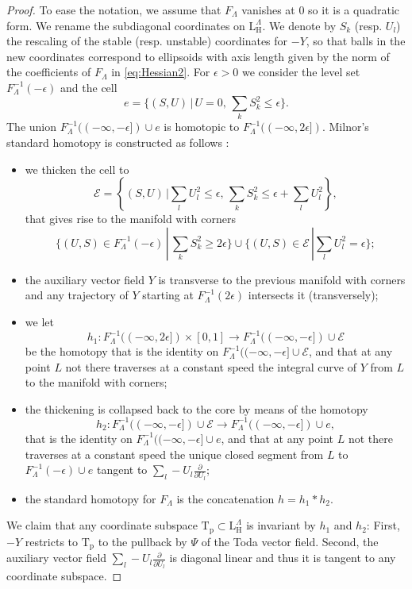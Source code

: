 \documentclass[reqno]{amsart}
\newcommand{\p}{\mathrm{p}}
\newcommand{\T}{\mathbb{T}}
\renewcommand{\L}{\mathrm{L}}
\renewcommand{\T}{\mathrm{T}}
\renewcommand{\H}{\mathrm{H}}
\begin{document}
\begin{proof}
To ease the notation, we  assume that $F_\Lambda$ vanishes at $0$ so it is a quadratic form.
We rename the subdiagonal coordinates on $\L^\Lambda_\H$. We denote by $S_k$ (resp. $U_l$) the rescaling of the stable (resp. unstable) coordinates for $-Y$, so that balls in the new coordinates correspond to ellipsoids with axis length given by the norm of the coefficients  of $F_\Lambda$  in \eqref{eq:Hessian2}.
For $\epsilon>0$ we consider  the level set $F_{\Lambda}^{-1}(-\epsilon)$ and the cell
\[e=\{(S,U)\,|\,U=0,\,\sum_k {S_k^2}\leq \epsilon\}.\]
The union  $F_\Lambda^{-1}((-\infty,-\epsilon])\cup e$ is homotopic to $F_\Lambda^{-1}((-\infty,2\epsilon])$. Milnor's standard homotopy is constructed as follows \cite{Mi}:
\begin{itemize}
 \item we thicken the cell to
\[\mathcal{E}=\left\{(S,U)\,|\sum_l {U_l^2}\leq \epsilon,\,\sum_k S_k^2\leq \epsilon+\sum_l U_l^2\right\},\]
that gives rise  to the manifold with corners
\[\{(U,S)\in F_\Lambda^{-1}(-\epsilon)\,|\, \sum_k{S_k^2}\geq 2\epsilon\}\cup \{(U,S)\in \mathcal{E}\,| \sum_l U_l^2=\epsilon\};\]
\item the auxiliary vector field $Y$ is transverse to the previous manifold with corners
and any trajectory of $Y$ starting at $F_\Lambda^{-1}(2\epsilon)$ intersects it (transversely);
\item we let
\[h_1:F_\Lambda^{-1}((-\infty,2\epsilon])\times [0,1]\to F_\Lambda^{-1}((-\infty,-\epsilon])\cup \mathcal{E}\]
be the homotopy that is the identity on $F_\Lambda^{-1}((-\infty,-\epsilon]\cup \mathcal{E}$, and that at any point $L$ not there  traverses at a constant speed the  integral curve of $Y$  from $L$ to the manifold with corners;
\item the thickening is collapsed back to the core by means of  the homotopy
\[h_2:F_\Lambda^{-1}((-\infty,-\epsilon])\cup \mathcal{E}\to F_\Lambda^{-1}((-\infty,-\epsilon])\cup e,\]
 that is the identity on $F_\Lambda^{-1}((-\infty,-\epsilon]\cup e$, and that at any point $L$ not there  traverses at a constant speed the unique closed segment from $L$  to $F_\Lambda^{-1}(-\epsilon)\cup e$ tangent to $\sum_l -U_l\frac{\partial}{\partial U_l}$;
\item the standard homotopy for $F_\Lambda$  is the concatenation  $h=h_1*h_2$.
\end{itemize}
We claim that any coordinate subspace $\T_\p\subset \L^\Lambda_\H$ is invariant by $h_1$ and $h_2$: First,  $-Y$ restricts to $\T_\p$ to the pullback by $\Psi$ of the Toda vector field. Second,  the auxiliary vector field $\sum_l -U_l\frac{\partial}{\partial U_l}$ is diagonal linear and thus it is tangent to any coordinate subspace.


\end{proof}
\end{document}
